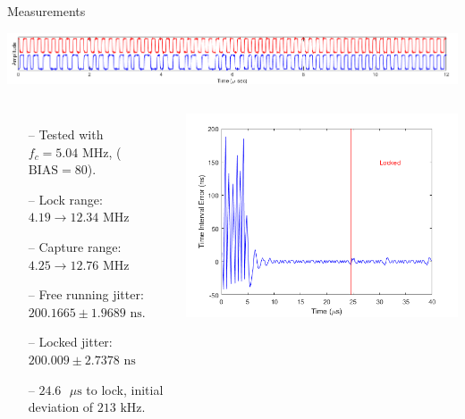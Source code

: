 \documentclass{beamer}
\begin{document}
\begin{frame}{Measurements}
	\vspace*{-5mm}
	\begin{center}
		\includegraphics[scale=0.4125]{../impl_waveform}
	\end{center}
   	\begin{columns}
    	\begin{itemize}
            \item[--]
                Tested with $f_c=5.04\textrm{ MHz}$, ($\textrm{BIAS}=80$).
    		\item[--]
	    		Lock range: $4.19\rightarrow12.34\textrm{ MHz}$ 
            \item[--]
                Capture range: $4.25\rightarrow12.76\textrm{ MHz}$
            \item[--]
                Free running jitter: $200.1665\pm1.9689\textrm{ ns}$.
            \item[--]
                Locked jitter: $200.009\pm2.7378\textrm{ ns}$
            \item[--]
                $24.6\textrm{ }\mu\textrm{s}$ to lock, initial deviation of $213\textrm{ kHz}$. 
        \end{itemize}
    	
    	\includegraphics[scale=0.4125]{../impl_locking}
    \end{columns}
\end{frame}
\end{document}
